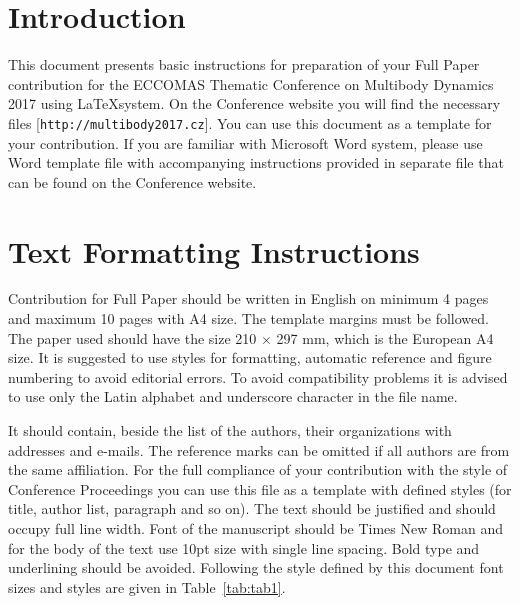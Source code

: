\documentclass{mbd_fullpaper}
\begin{document}
\section{Introduction}

This document presents basic instructions for preparation of your Full Paper contribution for the ECCOMAS Thematic Conference on Multibody Dynamics 2017 using \LaTeX system. On the Conference website you will find the necessary files [\texttt{http://multibody2017.cz}]. You can use this document as a template for your contribution. If you are familiar with Microsoft Word system, please use Word template file with accompanying instructions provided in separate file that can be found on the Conference website.


\section{Text Formatting Instructions}
Contribution for Full Paper should be written in English on minimum 4 pages and maximum 10 pages with A4 size. The template margins must be followed. The paper used should have the size 210 $\times$ 297 mm, which is the European A4 size. It is suggested to use styles for formatting, automatic reference and figure numbering to avoid editorial errors. To avoid compatibility problems it is advised to use only the Latin alphabet and underscore character in the file name.

It should contain, beside the list of the authors, their organizations with addresses and e-mails. The reference marks can be omitted if all authors are from the same affiliation.
For the full compliance of your contribution with the style of Conference Proceedings you can use this file as a template with defined styles (for title, author list, paragraph and so on). The text should be justified and should occupy full line width. Font of the manuscript should be Times New Roman and for the body of the text use 10pt size with single line spacing. Bold type and underlining should be avoided. Following the style defined by this document font sizes and styles are given in Table~\ref{tab:tab1}.

\renewcommand{\arraystretch}{1.5}
\end{document}
